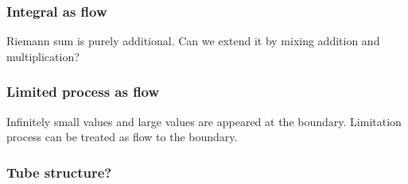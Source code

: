 \documentclass[aspectratio=169]{beamer}
\begin{document}
\begin{frame}
\frametitle{Integral as flow}
    Riemann sum is purely additional.
    Can we extend it by mixing addition and multiplication?
\end{frame}

\begin{frame}
    \frametitle{Limited process as flow}
    Infinitely small values and large values are appeared at the boundary.
    Limitation process can be treated as flow to the boundary.
    \begin{figure}[ht]\centering
    \end{figure}
\end{frame}

\begin{frame}
    \frametitle{Tube structure?}
    \begin{figure}[ht]\centering
    \end{figure}
\end{frame}
\end{document}
